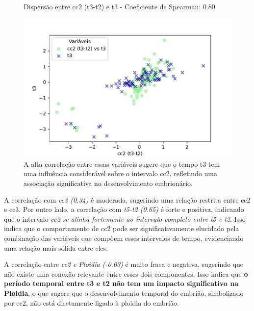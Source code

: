 \begin{figure}[h]
    \captionsetup{font=footnotesize, justification=centering, labelsep=period, position=above}
    \caption{Dispersão entre cc2 (t3-t2) e t3 - Coeficiente de Spearman: 0.80}
    \label{fig:cc2-t3}
    \centering
    \includegraphics[scale=0.4]{figuras/Spearman/cc2-t3.pdf}
    \vspace{0.3cm} 
    \caption{A alta correlação entre essas variáveis sugere que o tempo t3 tem uma influência considerável sobre o intervalo cc2, refletindo uma associação significativa no desenvolvimento embrionário. }
    \begin{minipage}{\linewidth}
        \centering
    \end{minipage}
\end{figure}
\FloatBarrier

A correlação com \textit{cc3 (0.34)} é moderada, sugerindo uma relação restrita entre cc2 e cc3. Por outro lado, a correlação com \textit{t5-t2 (0.65)} é forte e positiva, indicando que o intervalo \textit{cc2 se alinha fortemente ao intervalo completo entre t5 e t2}. Isso indica que o comportamento de cc2 pode ser significativamente elucidado pela combinação das variáveis que compõem esses intervalos de tempo, evidenciando uma relação mais sólida entre eles.

A correlação entre \textit{cc2 e Ploidia (-0.03)} é muito fraca e negativa, sugerindo que não existe uma conexão relevante entre esses dois componentes. Isso indica que \textbf{o período temporal entre t3 e t2 não tem um impacto significativo na Ploidia}, o que sugere que o desenvolvimento temporal do embrião, simbolizado por cc2, não está diretamente ligado à ploidia do embrião.

